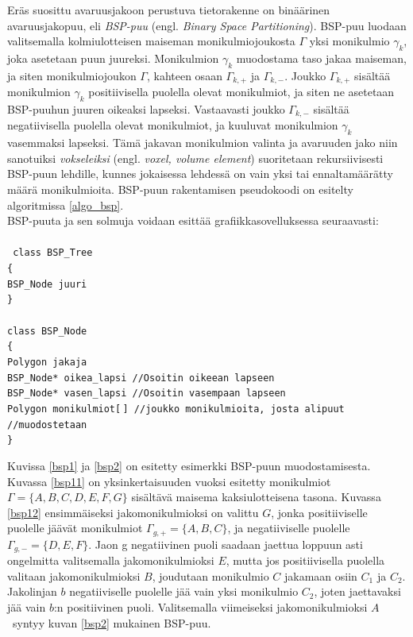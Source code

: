 \documentclass[a4paper, 12pt, titlepage]{article}
\newcommand{\tab}[1][0.5cm]{\hspace*{#1}} %
\newcommand{\code}[1]{\small\texttt{#1}} %
\begin{document}
Eräs suosittu avaruusjakoon perustuva tietorakenne on binäärinen avaruusjakopuu, eli \emph{BSP-puu} (engl. \emph{Binary Space Partitioning}). BSP-puu luodaan valitsemalla kolmiulotteisen maiseman  monikulmiojoukosta $\Gamma$ yksi monikulmio $\gamma_k$, joka asetetaan puun juureksi. Monikulmion $\gamma_k$ muodostama taso jakaa maiseman, ja siten monikulmiojoukon $\Gamma$, kahteen osaan $\Gamma_{k,+}$ ja $\Gamma_{k,-}$. Joukko $\Gamma_{k,+}$ sisältää monikulmion $\gamma_k$ positiivisella puolella olevat monikulmiot, ja siten ne asetetaan BSP-puuhun juuren oikeaksi lapseksi. Vastaavasti joukko $\Gamma_{k,-}$ sisältää negatiivisella puolella olevat monikulmiot, ja kuuluvat monikulmion $\gamma_k$ vasemmaksi lapseksi. Tämä jakavan monikulmion valinta ja avaruuden jako niin sanotuiksi \emph{vokseleiksi} (engl. \emph{voxel, volume element}) suoritetaan rekursiivisesti BSP-puun lehdille, kunnes jokaisessa lehdessä on vain yksi tai ennaltamäärätty määrä monikulmioita. \citep[.]{samet} BSP-puun rakentamisen pseudokoodi on esitelty algoritmissa \ref{algo_bsp}.\\

BSP-puuta ja sen solmuja voidaan esittää grafiikkasovelluksessa seuraavasti:\\\\%
\code{
class BSP\_Tree\\
\{\\
\tab BSP\_Node juuri\\
\}\\\\
class BSP\_Node\\
\{\\
\tab Polygon jakaja\\
\tab BSP\_Node* oikea\_lapsi \tab //Osoitin oikeean lapseen\\
\tab BSP\_Node* vasen\_lapsi \tab //Osoitin vasempaan lapseen\\
\tab Polygon monikulmiot[$\,$] \tab //joukko monikulmioita, josta alipuut\\ 
\hspace*{5.2cm} //muodostetaan\\
\}\\}


\vspace{-0.5cm}

Kuvissa \ref{bsp1} ja \ref{bsp2} on esitetty esimerkki BSP-puun muodostamisesta. Kuvassa \ref{bsp11} on yksinkertaisuuden vuoksi esitetty monikulmiot $\Gamma=\{A,B,C,D,E,F,G\}$ sisältävä maisema kaksiulotteisena tasona. Kuvassa \ref{bsp12} ensimmäiseksi jakomonikulmioksi on valittu $G$, jonka positiiviselle puolelle jäävät monikulmiot $\Gamma_{g,+} = \{A,B,C\}$, ja negatiiviselle puolelle $\Gamma_{g,-} = \{D,E,F\}$. Jaon g negatiivinen puoli saadaan jaettua loppuun asti ongelmitta valitsemalla jakomonikulmioksi $E$, mutta jos positiivisella puolella valitaan jakomonikulmioksi $B$, joudutaan monikulmio $C$ jakamaan osiin $C_1$ ja $C_2$. Jakolinjan $b$ negatiiviselle puolelle jää vain yksi monikulmio $C_2$, joten jaettavaksi jää vain $b$:n positiivinen puoli. Valitsemalla viimeiseksi jakomonikulmioksi $A$ syntyy kuvan \ref{bsp2} mukainen BSP-puu.\\
\end{document}
